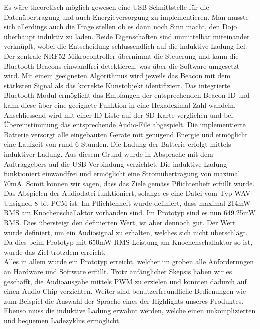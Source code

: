 Es wäre theoretisch möglich gewesen eine USB-Schnittstelle für die Datenübertragung und auch Energieversorgung zu implementieren. Man musste sich allerdings auch die Frage stellen ob es dann noch Sinn macht, den Dōjō überhaupt induktiv zu laden. Beide Eigenschaften sind unmittelbar miteinander verknüpft, wobei die Entscheidung schlussendlich auf die induktive Ladung fiel. Der zentrale NRF52-Mikrocontroller übernimmt die Steuerung und kann die Bluetooth-Beacons einwandfrei detektieren, was über die Software umgesetzt wird. Mit einem geeigneten Algorithmus wird jeweils das Beacon mit dem stärksten Signal als das {\glqq korrekte\grqq} Kunstobjekt identifiziert. Das integrierte Bluetooth-Modul ermöglicht das Empfangen der entsprechenden Beacon-ID und kann diese über eine geeignete Funktion in eine Hexadezimal-Zahl wandeln. Anschliessend wird mit einer ID-Liste auf der SD-Karte verglichen und bei Übereinstimmung das entsprechende Audio-File abgespielt. Die implementierte Batterie versorgt alle eingebauten Geräte mit genügend Energie und ermöglicht eine Laufzeit von rund 6 Stunden. Die Ladung der Batterie erfolgt mittels induktiver Ladung. Aus diesem Grund wurde in Absprache mit dem Auftraggebers auf die USB-Verbindung verzichtet. Die induktive Ladung funktioniert einwandfrei und ermöglicht eine Stromübertragung von maximal 70mA. Somit können wir sagen, dass das Ziele gemäss Pflichtenheft erfüllt wurde. Das Abspielen der Audiodatei funktioniert, solange es eine Datei vom Typ WAV Unsigned 8-bit PCM ist. Im Pflichtenheft wurde definiert, dass maximal 214mW RMS am Knochenschallaktor vorhanden sind. Im Prototyp sind es nun 649.25mW RMS. Dies übersteigt den definierten Wert, ist aber dennoch gut. Der Wert wurde definiert, um ein Audiosignal zu erhalten, welches sich nicht überschlägt. Da dies beim Prototyp mit 650mW RMS Leistung am Knochenschallaktor so ist, wurde das Ziel trotzdem erreicht.\\
Alles in allem wurde ein Prototyp erreicht, welcher im groben alle Anforderungen an Hardware und Software erfüllt. Trotz anfänglicher Skepsis haben wir es geschafft, die Audioausgabe mittels PWM zu erzielen und konnten dadurch auf einen Audio-Chip verzichten. Weiter sind benutzerfreundliche Bedienungen wie zum Beispiel die Auswahl der Sprache eines der Highlights unseres Produktes. Ebenso muss die induktive Ladung erwähnt werden, welche einen unkomplizierten und bequemen Ladezyklus ermöglicht.
 
